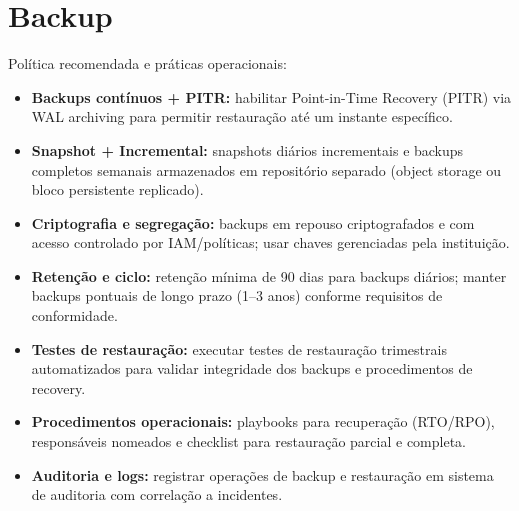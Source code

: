 \documentclass[12pt,a4paper]{article}
\begin{document}
\section{Backup}
Política recomendada e práticas operacionais:
\begin{itemize}[leftmargin=*]
  \item \textbf{Backups contínuos + PITR:} habilitar Point-in-Time Recovery (PITR) via WAL archiving para permitir restauração até um instante específico.
  \item \textbf{Snapshot + Incremental:} snapshots diários incrementais e backups completos semanais armazenados em repositório separado (object storage ou bloco persistente replicado).
  \item \textbf{Criptografia e segregação:} backups em repouso criptografados e com acesso controlado por IAM/políticas; usar chaves gerenciadas pela instituição.
  \item \textbf{Retenção e ciclo:} retenção mínima de 90 dias para backups diários; manter backups pontuais de longo prazo (1–3 anos) conforme requisitos de conformidade.
  \item \textbf{Testes de restauração:} executar testes de restauração trimestrais automatizados para validar integridade dos backups e procedimentos de recovery.
  \item \textbf{Procedimentos operacionais:} playbooks para recuperação (RTO/RPO), responsáveis nomeados e checklist para restauração parcial e completa.
  \item \textbf{Auditoria e logs:} registrar operações de backup e restauração em sistema de auditoria com correlação a incidentes.
\end{itemize}
\end{document}
